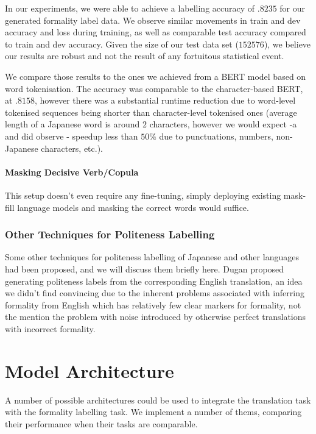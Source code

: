 \documentclass[11pt]{article}
\begin{document}
In our experiments, we were able to achieve a labelling accuracy of $.8235$ for our generated formality label data. We observe similar movements in train and dev accuracy and loss during training, as well as comparable test accuracy compared to train and dev accuracy. Given the size of our test data set ($152576$), we believe our results are robust and not the result of any fortuitous statistical event.

We compare those results to the ones we achieved from a BERT model based on word tokenisation. The accuracy was comparable to the character-based BERT, at $.8158$, however there was a substantial runtime reduction due to word-level tokenised sequences being shorter than character-level tokenised ones (average length of a Japanese word is around $2$ characters, however we would expect -a and did observe - speedup less than $50\%$ due to punctuations, numbers, non-Japanese characters, etc.). 

\paragraph{Masking Decisive Verb/Copula}

This setup doesn't even require any fine-tuning, simply deploying existing mask-fill language models and masking the correct words would suffice. 

\subsubsection{Other Techniques for Politeness Labelling}

Some other techniques for politeness labelling of Japanese and other languages had been proposed, and we will discuss them briefly here. Dugan \cite{Dugan:20} proposed generating politeness labels from the corresponding English translation, an idea we didn't find convincing due to the inherent problems associated with inferring formality from English which has relatively few clear markers for formality, not the mention the problem with noise introduced by otherwise perfect translations with incorrect formality.

\section{Model Architecture}

A number of possible architectures could be used to integrate the translation task with the formality labelling task. We implement a number of thems, comparing their performance when their tasks are comparable.
\end{document}
